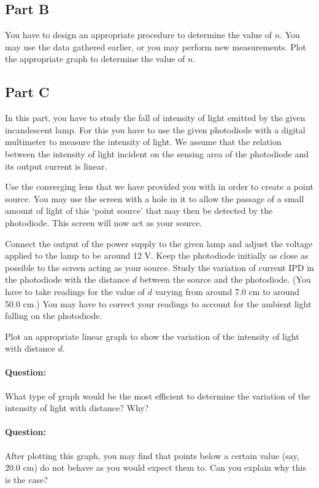 \subsection*{Part B}

You have to design an appropriate procedure to determine the value of $n$. You may use the data gathered earlier, or you may perform new measurements. Plot the appropriate graph to determine the value of $n$.

\subsection*{Part C}

In this part, you have to study the fall of intensity of light emitted by the given incandescent lamp.  For this you have to use the given photodiode with a digital multimeter to measure the intensity of light. We assume that the relation between the intensity of light incident on the sensing area of the photodiode and its output current is linear. 

Use the converging lens that we have provided you with in order to create a point source. You may use the screen with a hole in it to allow the passage of a small amount of light of this `point source' that may then be detected by the photodiode. This screen will now act as your source.

Connect the output of the power supply to the given lamp and adjust the voltage applied to the lamp to be around 12 V. Keep the photodiode initially as close as possible to the screen acting as your source.  Study the variation of current IPD in the photodiode with the distance $d$ between the source and the photodiode. (You have to take readings for the value of $d$ varying from around 7.0 cm to around 50.0 cm.) You may have to correct your readings to account for the ambient light falling on the photodiode. 

Plot an appropriate linear graph to show the variation of the intensity of light with distance $d$.

\begin{question}
\paragraph{Question:} What type of graph would be the most efficient to determine the variation of the intensity of light with distance? Why? ~\\

\paragraph{Question:} After plotting this graph, you may find that points below a certain value (say, 20.0 cm) do not behave as you would expect them to. Can you explain why this is the case?
\end{question}


